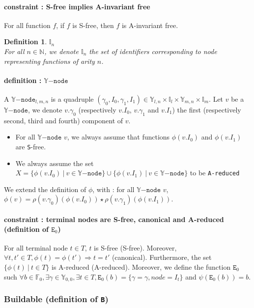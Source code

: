 \documentclass[a4paper,10pt]{article}
\newcommand{\N}{\mathbb{N}}%
\newcommand{\F}{\mathbb{F}}
\newcommand{\Y}{\mathbb{Y}}
\newcommand{\I}{\mathbb{I}}
\newcommand{\Ynode}{\Y\mathtt{-node}}
\newtheorem{newdef}{Definition}
\newcommand{\definition}[2]{\begin{newdef}{#1\\}#2\end{newdef}}
\begin{document}
\paragraph{constraint : S-free implies A-invariant free\\}
For all function $f$, if $f$ is S-free, then $f$ is A-invariant free.


\definition{$\I_n$}
{
For all $n\in\N$, we denote $\I_n$ the set of identifiers corresponding to node representing functions of arity $n$.
}

\paragraph{definition : $\Ynode$\\}
A $\Ynode_{l, m, n}$ is a quadruple $(\gamma_0, I_0, \gamma_1, I_1) \in \Y_{l, n} \times \I_l \times \Y_{m, n} \times \I_m$. Let $v$ be a $\Ynode$, we denote $v.\gamma_0$ (respectively $v.I_0$, $v.\gamma_1$ and $v.I_1$) the first (respectively second, third and fourth) component of $v$.
\begin{itemize}
\item For all $\Ynode$ $v$, we always assume that functions $\phi(v.I_0)$ and $\phi(v.I_1)$ are \texttt{S}-free.
\item We always assume the set $X = \{\phi(v.I_0) ~|~ v \in\Ynode\} \cup \{\phi(v.I_1) ~|~ v\in\Ynode\}$ to be \texttt{A-reduced}
\end{itemize}
We extend the definition of $\phi$, with : for all $\Ynode$ $v$, $\phi(v) = \rho(v.\gamma_0)(\phi(v.I_0)) \star \rho(v.\gamma_1)(\phi(v.I_1))$.

\paragraph{constraint : terminal nodes are S-free, canonical and A-reduced (definition of $\mathtt{E}_0$)}
For all terminal node $t \in T$, $t$ is S-free (S-free).
Moreover, $\forall t, t' \in T, \phi(t) = \phi(t') \Rightarrow t = t'$ (canonical).
Furthermore, the set $\{\phi(t) ~|~ t\in T\}$ is A-reduced (A-reduced).
Moreover, we define the function $\mathtt{E}_0$ such $\forall b\in\F_0, \exists \gamma\in\Y_{0, 0}, \exists t\in T, \mathtt{E}_0(b) = \{\gamma = \gamma, node = I_t\}$ and $\psi(\mathtt{E}_0(b)) = b$.


\subsubsection{Buildable (definition of \texttt{B})}
\end{document}
